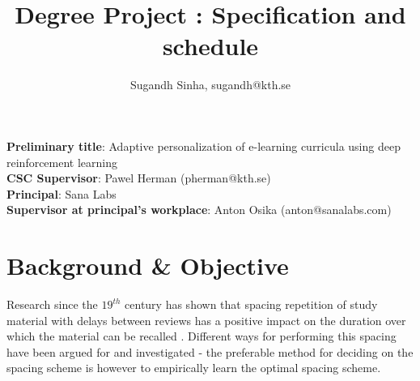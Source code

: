 \documentclass[12pt]{article}
\begin{document}
\title{Degree Project : Specification and schedule
}
\author{Sugandh Sinha, sugandh@kth.se}
\date{}

\maketitle
\textbf{Preliminary title}: {\color{black}Adaptive personalization of e-learning curricula using deep reinforcement learning}\\

\textbf{CSC Supervisor}: Pawel Herman (pherman@kth.se)\\

\textbf{Principal}: Sana Labs\\

\textbf{Supervisor at principal's workplace}: Anton Osika (anton@sanalabs.com)\\

\section{Background \& Objective}
Research since the $19^{th}$ century has shown that spacing repetition of study material with delays between reviews has a positive impact on the duration over which the material can be recalled {\color{blue}\cite{ebbi, space_rep}}. Different ways for performing this spacing have been argued for and investigated -  the preferable method for deciding on the spacing scheme is however to empirically learn the optimal spacing scheme.\\
\end{document}
